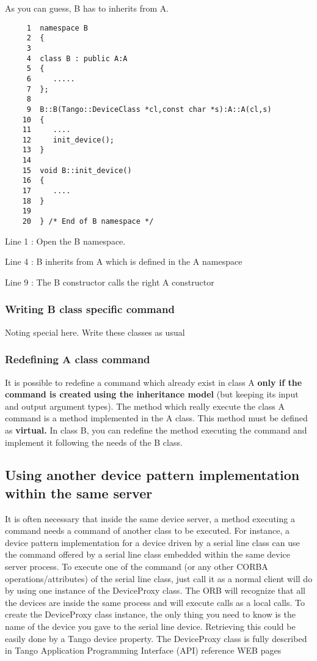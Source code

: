 As you can guess, B has to inherits from A.


\begin{verbatim}
     1  namespace B
     2  {
     3  
     4  class B : public A:A
     5  {
     6     .....
     7  };
     8  
     9  B::B(Tango::DeviceClass *cl,const char *s):A::A(cl,s)
    10  {
    11     ....
    12     init_device();
    13  }
    14  
    15  void B::init_device()
    16  {
    17     ....
    18  }
    19  
    20  } /* End of B namespace */
\end{verbatim}


Line 1 : Open the B namespace.

Line 4 : B inherits from A which is defined in the A namespace

Line 9 : The B constructor calls the right A constructor


\subsubsection{Writing B class specific command}

Noting special here. Write these classes as usual


\subsubsection{Redefining A class command}

It is possible to redefine a command which already exist in class
A \textbf{only if the command is created} \textbf{using the inheritance
model} (but keeping its input and output argument types). The method
which really execute the class A command is a method implemented in
the A class. This method must be defined as \textbf{virtual.} In class
B, you can redefine the method executing the command and implement
it following the needs of the B class.




\subsection{Using another device pattern implementation within the same server}

It is often necessary that inside the same device server,
a method executing a command needs a command of another class to be
executed. For instance, a device pattern implementation for a device
driven by a serial line class can use the command offered by a serial
line class embedded within the same device server process. To execute
one of the command (or any other CORBA operations/attributes)
of the serial line class, just call it as a normal client will do
by using one instance of the DeviceProxy class\emph{.} The ORB will
recognize that all the devices are inside the same process and will
execute calls as a local calls. To create the DeviceProxy
class instance, the only thing you need to know is the name of the
device you gave to the serial line device. Retrieving this could be
easily done by a Tango device property. The DeviceProxy class is fully
described in Tango Application Programming Interface (API) reference
WEB pages


